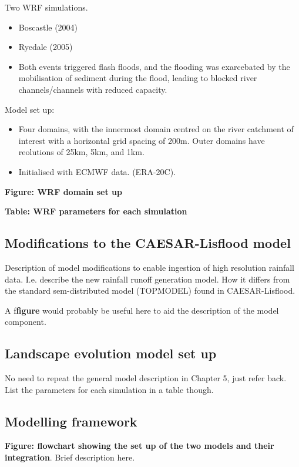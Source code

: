 Two WRF simulations.

\begin{itemize}
\item Boscastle (2004)
\item Ryedale (2005)
\item Both events triggered flash floods, and the flooding was exarcebated by the mobilisation of sediment during the flood, leading to blocked river channels/channels with reduced capacity.
\end{itemize}

Model set up:
\begin{itemize}
\item Four domains, with the innermost domain centred on the river catchment of interest with a horizontal grid spacing of 200m. Outer domains have reolutions of 25km, 5km, and 1km.
\item Initialised with ECMWF data. (ERA-20C).
\end{itemize}

\textbf{Figure: WRF domain set up}

\textbf{Table: WRF parameters for each simulation}

\subsection{Modifications to the CAESAR-Lisflood model}
Description of model modifications to enable ingestion of high resolution rainfall data. I.e. describe the new rainfall runoff generation model. How it differs from the standard sem-distributed model (TOPMODEL) found in CAESAR-Lisflood.

A f\textbf{figure} would probably be useful here to aid the description of the model component. 

\subsection{Landscape evolution model set up}

No need to repeat the general model description in Chapter 5, just refer back. List the parameters for each simulation in a table though.

\subsection{Modelling framework}

\textbf{Figure: flowchart showing the set up of the two models and their integration}. Brief description here.

